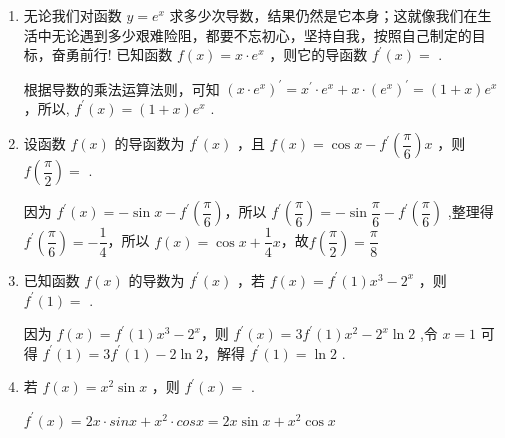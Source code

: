 \begin{enumerate}
    \item 无论我们对函数 $y = {{e}}^{x}$ 求多少次导数，结果仍然是它本身；这就像我们在生活中无论遇到多少艰难险阻，都要不忘初心，坚持自我，按照自己制定的目标，奋勇前行! 已知函数 $f\left( x\right)  = x \cdot  {{e}}^{x}$ ，则它的导函数 ${f}^{\prime }\left( x\right)  =$ .
    \begin{jieda}
        根据导数的乘法运算法则，可知 ${\left( x \cdot  {{e}}^{x}\right) }^{\prime } = {x}^{\prime } \cdot  {{e}}^{x} + x \cdot  {\left( {{e}}^{x}\right) }^{\prime } = \left( {1 + x}\right) {{e}}^{x}$，所以, ${f}^{\prime }\left( x\right)  = \left( {1 + x}\right) {{e}}^{x}$ .
    \end{jieda}

    \item 设函数 $f\left( x\right)$ 的导函数为 ${f}^{\prime }\left( x\right)$ ，且 $f\left( x\right)  = \cos x - {f}^{\prime }\left( \dfrac{\pi }{6}\right) x$ ，则 $f\left( \dfrac{\pi }{2}\right)  =$ .
    \begin{jieda}
        因为 ${f}^{\prime }\left( x\right)  =  - \sin x - {f}^{\prime }\left( \dfrac{\pi }{6}\right)$，所以 ${f}^{\prime }\left( \dfrac{\pi }{6}\right)  =  - \sin \dfrac{\pi }{6} - {f}^{\prime }\left( \dfrac{\pi }{6}\right)$ ,整理得 ${f}^{\prime }\left( \dfrac{\pi }{6}\right)  =  - \dfrac{1}{4}$，所以 $f\left( x\right)  = \cos x + \dfrac{1}{4}x$，故$f\left( \dfrac{\pi }{2}\right) = \dfrac{\pi}{8}$
    \end{jieda}

    \item 已知函数 $f\left( x\right)$ 的导数为 ${f}^{\prime }\left( x\right)$ ，若 $f\left( x\right)  = {f}^{\prime }\left( 1\right) {x}^{3} - {2}^{x}$ ，则 ${f}^{\prime }\left( 1\right)  =$ .
    \begin{jieda}
        因为 $f\left( x\right)  = {f}^{\prime }\left( 1\right) {x}^{3} - {2}^{x}$，则 ${f}^{\prime }\left( x\right)  = 3{f}^{\prime }\left( 1\right) {x}^{2} - {2}^{x}\ln 2$ ,令 $x = 1$ 可得 ${f}^{\prime }\left( 1\right)  = 3{f}^{\prime }\left( 1\right)  - 2\ln 2$，解得 ${f}^{\prime }\left( 1\right)  = \ln 2$ .
    \end{jieda}

    \item 若 $f\left( x\right)  = {x}^{2}\sin x$ ，则 ${f}^{\prime }\left( x\right)  =$ .
    \begin{jieda}
        ${f}^{\prime }\left( x\right)  = 2x \cdot sinx + x^2 \cdot cosx = {2x}\sin x + {x}^{2}\cos x$
    \end{jieda}


\end{enumerate}
